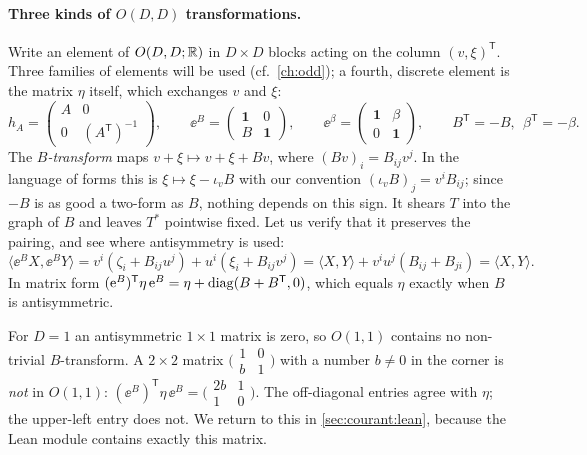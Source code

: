 \paragraph{Three kinds of $O(D,D)$ transformations.} Write an element of $O(D,D;\mathbb{R})$ in $D\times D$
blocks acting on the column $(v,\xi)^{\mathsf T}$. Three families of elements will be used (cf.\ \cref{ch:odd}); a fourth, discrete element is the matrix
$\eta$ itself, which exchanges $v$ and $\xi$:
\begin{equation}\label{eq:courant:generators}
h_A=\begin{pmatrix}A&0\\0&(A^{\mathsf T})^{-1}\end{pmatrix},\qquad
\ee^{B}=\begin{pmatrix}\mathbf 1&0\\ B&\mathbf 1\end{pmatrix},\qquad
\ee^{\beta}=\begin{pmatrix}\mathbf 1&\beta\\ 0&\mathbf 1\end{pmatrix},\qquad
B^{\mathsf T}=-B,\ \ \beta^{\mathsf T}=-\beta .
\end{equation}
The \emph{$B$-transform} maps $v+\xi\mapsto v+\xi+Bv$, where
$(Bv)_i=B_{ij}v^j$. In the language of forms this is $\xi\mapsto\xi-\iota_vB$ with our convention
$(\iota_vB)_j=v^iB_{ij}$; since $-B$ is as good a two-form as $B$, nothing depends on this sign.
It shears $T$ into the graph of $B$ and leaves $T^*$ pointwise fixed. Let us verify that it
preserves the pairing, and see where antisymmetry is used:
\[
\langle \ee^BX,\ee^BY\rangle=v^i(\zeta_i+B_{ij}u^j)+u^i(\xi_i+B_{ij}v^j)
=\langle X,Y\rangle+v^iu^j(B_{ij}+B_{ji})=\langle X,Y\rangle .
\]
In matrix form $(\mathrm{e}^B)^{\mathsf T}\eta\,\mathrm{e}^B=\eta+\operatorname{diag}(B+B^{\mathsf T},0)$, which equals $\eta$
exactly when $B$ is antisymmetric.

\begin{pitfallbox}
For $D=1$ an antisymmetric $1\times1$ matrix is zero, so $O(1,1)$ contains no non-trivial
$B$-transform. A $2\times 2$ matrix $\bigl(\begin{smallmatrix}1&0\\ b&1\end{smallmatrix}\bigr)$ with
a number $b\neq0$ in the corner is \emph{not} in $O(1,1)$:
$(\ee^B)^{\mathsf T}\eta\,\ee^B=\bigl(\begin{smallmatrix}2b&1\\1&0\end{smallmatrix}\bigr)$. The
off-diagonal entries agree with $\eta$; the upper-left entry does not. We return to this in
\cref{sec:courant:lean}, because the Lean module contains exactly this matrix.
\end{pitfallbox}

